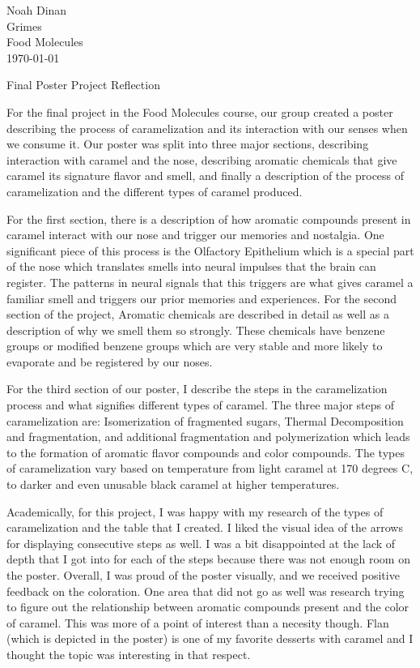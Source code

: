 \documentclass[12pt]{article}
\begin{document}
\noindent
Noah Dinan \\ Grimes \\ Food Molecules \\ \today \\

\begin{center}
Final Poster Project Reflection
\end{center}

\setlength{\parindent}{0.5in}

For the final project in the Food Molecules course, our group created a poster describing the process of caramelization and its interaction with
our senses when we consume it. Our poster was split into three major sections, describing interaction with caramel and the nose, describing aromatic chemicals
that give caramel its signature flavor and smell, and finally a description of the process of caramelization and the different types of caramel produced.

For the first section, there is a description of how aromatic compounds present in caramel interact with our nose and trigger our memories and nostalgia.
One significant piece of this process is the Olfactory Epithelium which is a special part of the nose which translates smells into neural impulses that
the brain can register. The patterns in neural signals that this triggers are what gives caramel a familiar smell and triggers our prior memories and 
experiences. For the second section of the project, Aromatic chemicals are described in detail as well as a description of why we smell them so strongly.
These chemicals have benzene groups or modified benzene groups which are very stable and more likely to evaporate and be registered by our noses.

For the third section of our poster, I describe the steps in the caramelization process and what signifies different types of caramel. The three major steps of
caramelization are: Isomerization of fragmented sugars, Thermal Decomposition and fragmentation, and additional fragmentation and polymerization which leads
to the formation of aromatic flavor compounds and color compounds. The types of caramelization vary based on temperature from light caramel at 170 degrees C, to
darker and even unusable black caramel at higher temperatures.

Academically, for this project, I was happy with my research of the types of caramelization and the table that I created. I liked the visual idea of the
arrows for displaying consecutive steps as well. I was a bit disappointed at the lack of depth that I got into for each of the steps because there was not enough
room on the poster. Overall, I was proud of the poster visually, and we received positive feedback on the coloration. One area that did not go as well was
research trying to figure out the relationship between aromatic compounds present and the color of caramel. This was more of a point of interest than
a necesity though. Flan (which is depicted in the poster) is one of my favorite desserts with caramel and I thought the topic was interesting in that respect.
\end{document}
